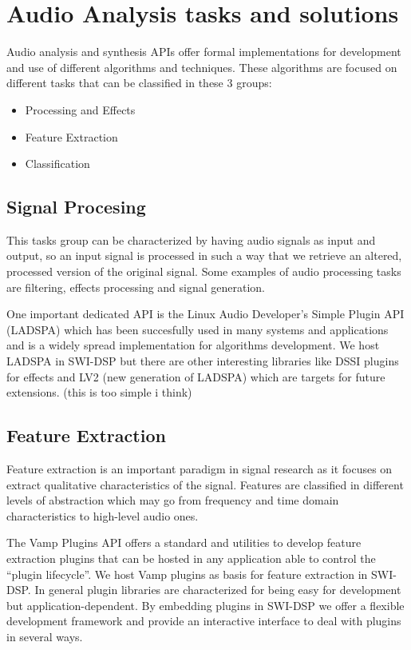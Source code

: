 \documentclass[runningheads]{llncs}
\begin{document}
\section{Audio Analysis tasks and solutions}\label{sec:tasks}

Audio analysis and synthesis APIs offer formal implementations for development and use of different algorithms and techniques. These algorithms are focused on different tasks that can be classified in these 3 groups:

\begin{itemize}
 \item Processing and Effects
 \item Feature Extraction
 \item Classification
\end{itemize}

\subsection{Signal Procesing}\label{subsec:effects}

This tasks group can be characterized by having audio signals as input and output, so an input signal is processed in such a way that we retrieve an altered, processed version of the original signal. Some examples of audio processing tasks are filtering, effects processing and signal generation.

One important dedicated API is the Linux Audio Developer's Simple Plugin API (LADSPA) which has been succesfully used in many systems and applications and is a widely spread implementation for algorithms development. We host LADSPA in SWI-DSP but there are other interesting libraries like DSSI plugins for effects and LV2 (new generation of LADSPA) which are targets for future extensions. (this is too simple i think)

\subsection{Feature Extraction}\label{subsec:feature}

Feature extraction is an important paradigm in signal research as it focuses on extract qualitative characteristics of the signal. Features are classified in different levels of abstraction which may go from frequency and time domain characteristics to high-level audio ones.

The Vamp Plugins API offers a standard and utilities to develop feature extraction plugins that can be hosted in any application able to control the ``plugin lifecycle''. We host Vamp plugins as basis for feature extraction in SWI-DSP. In general plugin libraries are characterized for being easy for development but application-dependent. By embedding plugins in SWI-DSP we offer a flexible development framework and provide an interactive interface to deal with plugins in several ways.
\end{document}

